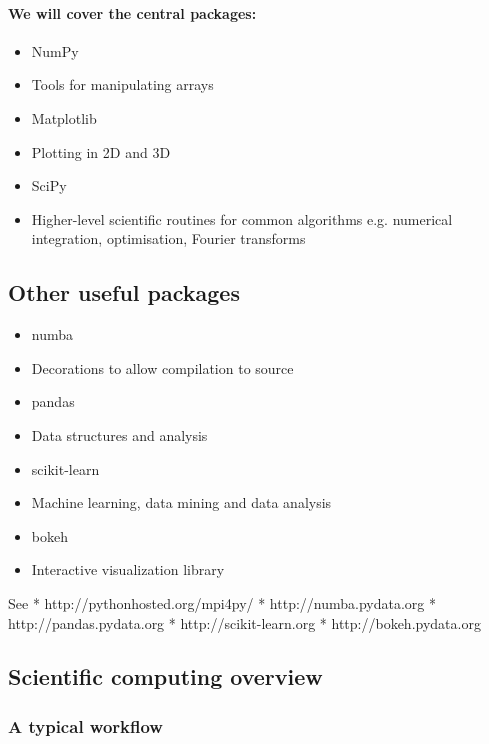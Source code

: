 \documentclass[11pt]{article}
\begin{document}
\paragraph{We will cover the central
packages:}\label{we-will-cover-the-central-packages}

\begin{itemize}
\item
  NumPy
\item
  Tools for manipulating arrays
\item
  Matplotlib
\item
  Plotting in 2D and 3D
\item
  SciPy
\item
  Higher-level scientific routines for common algorithms e.g. numerical
  integration, optimisation, Fourier transforms
\end{itemize}

    \subsection{Other useful packages}\label{other-useful-packages}

\begin{itemize}
\item
  numba
\item
  Decorations to allow compilation to source
\item
  pandas
\item
  Data structures and analysis
\item
  scikit-learn
\item
  Machine learning, data mining and data analysis
\item
  bokeh
\item
  Interactive visualization library
\end{itemize}

See * http://pythonhosted.org/mpi4py/ * http://numba.pydata.org *
http://pandas.pydata.org * http://scikit-learn.org *
http://bokeh.pydata.org

    \subsection{Scientific computing
overview}\label{scientific-computing-overview}

\subsubsection{A typical workflow}\label{a-typical-workflow}
\end{document}
